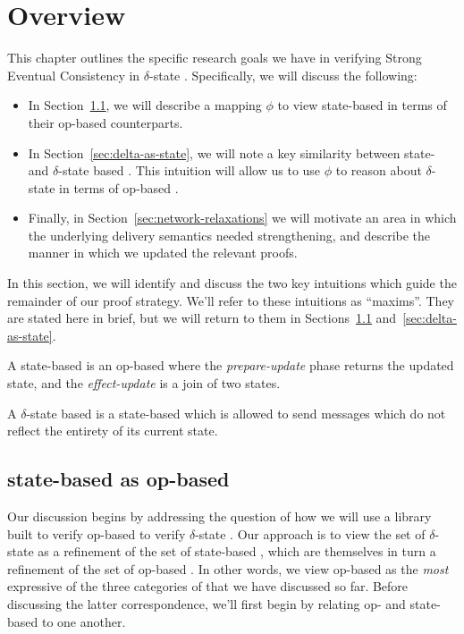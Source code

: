 \chapter{Overview}
\label{chap:overview}

This chapter outlines the specific research goals we have in verifying Strong
Eventual Consistency in $\delta$-state \CRDTs. Specifically, we will discuss the
following:
\begin{itemize}
  \item In Section~\ref{sec:state-as-op}, we will describe a mapping $\phi$ to
    view state-based \CRDTs in terms of their op-based counterparts.
  \item In Section~\ref{sec:delta-as-state}, we will note a key similarity
    between state- and $\delta$-state based \CRDTs. This intuition will allow us
    to use $\phi$ to reason about $\delta$-state \CRDTs in terms of op-based
    \CRDTs.
  \item Finally, in Section~\ref{sec:network-relaxations} we will motivate an
    area in which the underlying delivery semantics needed strengthening, and
    describe the manner in which we updated the relevant proofs.
\end{itemize}

In this section, we will identify and discuss the two key intuitions which guide
the remainder of our proof strategy. We'll refer to these intuitions as
``maxims''. They are stated here in brief, but we will return to them in
Sections~\ref{sec:state-as-op} and~\ref{sec:delta-as-state}.

\begin{maxim}
  \label{maxim:state-as-op}
  A state-based \CRDT is an op-based \CRDT where the \emph{prepare-update} phase
  returns the updated state, and the \emph{effect-update} is a join of two
  states.
\end{maxim}

\begin{maxim}
  \label{maxim:delta-as-state}
  A $\delta$-state based \CRDT is a state-based \CRDT which is allowed to send
  messages which do not reflect the entirety of its current state.
\end{maxim}

\section{state-based \CRDTs as op-based}
\label{sec:state-as-op}
Our discussion begins by addressing the question of how we will use a library
built to verify op-based \CRDTs to verify $\delta$-state \CRDTs. Our approach is
to view the set of $\delta$-state \CRDTs as a refinement of the set of
state-based \CRDTs, which are themselves in turn a refinement of the set of
op-based \CRDTs. In other words, we view op-based \CRDTs as the \emph{most}
expressive of the three categories of \CRDTs that we have discussed so far.
Before discussing the latter correspondence, we'll first begin by relating op-
and state-based \CRDTs to one another.

